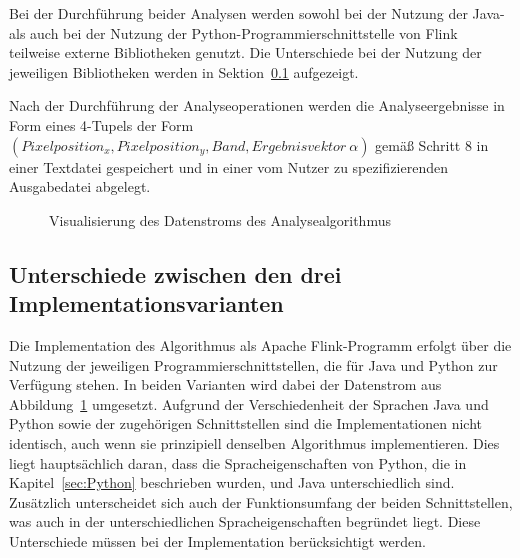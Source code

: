 Bei der Durchführung beider Analysen werden sowohl bei der Nutzung der Java- als auch bei der Nutzung der Python-Programmierschnittstelle von Flink teilweise externe Bibliotheken genutzt. Die Unterschiede bei der Nutzung der jeweiligen Bibliotheken werden in Sektion~\ref{sec:Differences} aufgezeigt. 

Nach der Durchführung der Analyseoperationen werden die Analyseergebnisse in Form eines 4-Tupels der Form $(Pixelposition_x, Pixelposition_y, Band, Ergebnisvektor\ \alpha)$ gemäß Schritt 8 in einer Textdatei gespeichert und in einer vom Nutzer zu spezifizierenden Ausgabedatei abgelegt.

\begin{figure}[h]
\centering

\caption{Visualisierung des Datenstroms des Analysealgorithmus} 
\label{fig:dataFlowAlgorithm}
\end{figure}


\subsection{Unterschiede zwischen den drei Implementationsvarianten}
\label{sec:Differences}
Die Implementation des Algorithmus als Apache Flink-Programm erfolgt über die Nutzung der jeweiligen Programmierschnittstellen, die für Java und Python zur Verfügung stehen. In beiden Varianten wird dabei der Datenstrom aus Abbildung~\ref{fig:dataFlowAlgorithm} umgesetzt. Aufgrund der Verschiedenheit der Sprachen Java und Python sowie der zugehörigen Schnittstellen sind die Implementationen nicht identisch, auch wenn sie prinzipiell denselben Algorithmus implementieren. Dies liegt hauptsächlich daran, dass die Spracheigenschaften von Python, die in Kapitel~\ref{sec:Python} beschrieben wurden, und Java unterschiedlich sind. Zusätzlich unterscheidet sich auch der Funktionsumfang der beiden Schnittstellen, was auch in der unterschiedlichen Spracheigenschaften begründet liegt. Diese Unterschiede müssen bei der Implementation berücksichtigt werden. 


